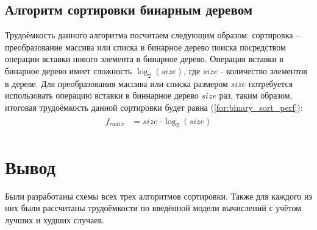\subsection{Алгоритм сортировки бинарным деревом}
Трудоёмкость данного алгоритма посчитаем следующим образом: сортировка -- преобразование массива или списка в бинарное дерево поиска посредством операции вставки нового элемента в бинарное дерево.
Операция вставки в бинарное дерево имеет сложность $ \log_{2}(size)$, где $size$ - количество элементов в дереве.
Для преобразования массива или списка размером $size$ потребуется использовать операцию вставки в биннарное дерево $size$ раз, таким образом, итоговая трудоёмкость данной сортировки будет равна (\ref{for:binary_sort_perf}):
\begin{align}
\begin{split}
	\label{for:binary_sort_perf}
	f_{radix} &= size \cdot \log_{2}(size)
\end{split}
\end{align}


\section*{Вывод}

Были разработаны схемы всех трех алгоритмов сортировки. Также для каждого из них были рассчитаны трудоёмкости по введённой модели вычислений с учётом лучших и худших случаев.
